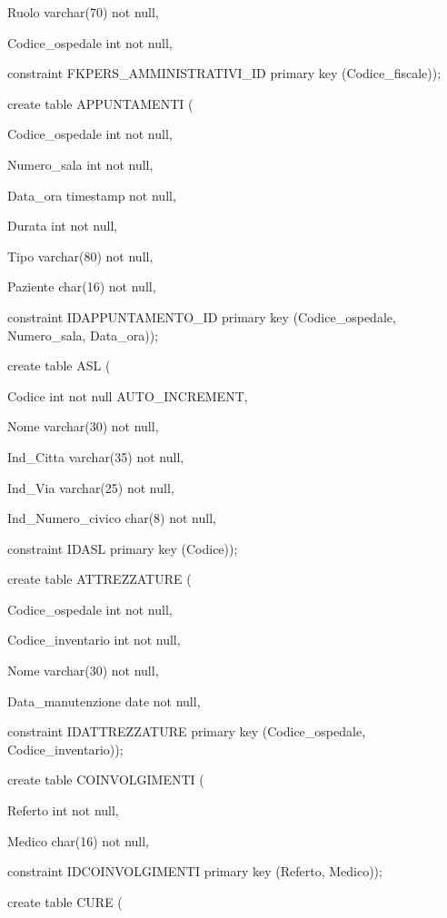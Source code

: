 \documentclass[a4paper,12pt]{report}
\begin{document}
     Ruolo varchar(70) not null,

     Codice\_ospedale int not null,

     constraint FKPERS\_AMMINISTRATIVI\_ID primary key (Codice\_fiscale)); \newline

\noindent create table APPUNTAMENTI (

     Codice\_ospedale int not null,

     Numero\_sala int not null,

     Data\_ora timestamp not null,

     Durata int not null,

     Tipo varchar(80) not null,

     Paziente char(16) not null,

     constraint IDAPPUNTAMENTO\_ID primary key (Codice\_ospedale, Numero\_sala, Data\_ora)); \newline

\noindent create table ASL (

     Codice int not null AUTO\_INCREMENT,

     Nome varchar(30) not null,

     Ind\_Citta varchar(35) not null,

     Ind\_Via varchar(25) not null,

     Ind\_Numero\_civico char(8) not null,

     constraint IDASL primary key (Codice)); \newline

\noindent create table ATTREZZATURE (

     Codice\_ospedale int not null,

     Codice\_inventario int not null,

     Nome varchar(30) not null,

     Data\_manutenzione date not null,

     constraint IDATTREZZATURE primary key (Codice\_ospedale, Codice\_inventario)); \newline

\noindent create table COINVOLGIMENTI (

     Referto int not null,

     Medico char(16) not null,

     constraint IDCOINVOLGIMENTI primary key (Referto, Medico)); \newline

\noindent create table CURE (
\end{document}
